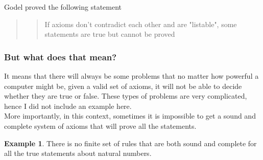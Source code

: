 \documentclass{article}
\theoremstyle{definition}
\newtheorem{ex}{Example}[section]
\begin{document}
  Godel proved the following statement
  \begin{quote}
    \centering
    \blockquote{If axioms don't contradict each other and are "listable", some statements are true but cannot be proved}
  \end{quote}
  
  \subsubsection{But what does that mean?}
  It means that there will always be some problems that no matter how
  powerful a computer might be, given a valid set of axioms, it will not
  be able to decide whether they are true or false. These types of problems
  are very complicated, hence I did not include an example here. \\

  More importantly, in this context, sometimes it is impossible to get a sound and complete system of axioms that will prove all the statements.

  \begin{ex}
    There is no finite set of rules that are both sound and complete for all the true statements about natural numbers.
  \end{ex}
\end{document}
